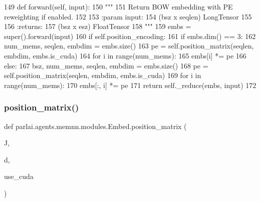 \begin{DoxyCode}
149     \textcolor{keyword}{def }forward(self, input):
150         \textcolor{stringliteral}{"""}
151 \textcolor{stringliteral}{        Return BOW embedding with PE reweighting if enabled.}
152 \textcolor{stringliteral}{}
153 \textcolor{stringliteral}{        :param input:}
154 \textcolor{stringliteral}{            (bsz x seqlen) LongTensor}
155 \textcolor{stringliteral}{}
156 \textcolor{stringliteral}{        :returns:}
157 \textcolor{stringliteral}{            (bsz x esz) FloatTensor}
158 \textcolor{stringliteral}{        """}
159         embs = super().forward(input)
160         \textcolor{keywordflow}{if} self.position\_encoding:
161             \textcolor{keywordflow}{if} embs.dim() == 3:
162                 num\_mems, seqlen, embdim = embs.size()
163                 pe = self.position\_matrix(seqlen, embdim, embs.is\_cuda)
164                 \textcolor{keywordflow}{for} i \textcolor{keywordflow}{in} range(num\_mems):
165                     embs[i] *= pe
166             \textcolor{keywordflow}{else}:
167                 bsz, num\_mems, seqlen, embdim = embs.size()
168                 pe = self.position\_matrix(seqlen, embdim, embs.is\_cuda)
169                 \textcolor{keywordflow}{for} i \textcolor{keywordflow}{in} range(num\_mems):
170                     embs[:, i] *= pe
171         \textcolor{keywordflow}{return} self.\_reduce(embs, input)
172 
\end{DoxyCode}
\mbox{\label{classparlai_1_1agents_1_1memnn_1_1modules_1_1Embed_aa6a44a42ac7d06f0f0598b7291d1dc58}} 
\subsubsection{\texorpdfstring{position\+\_\+matrix()}{position\_matrix()}}
{\footnotesize\ttfamily def parlai.\+agents.\+memnn.\+modules.\+Embed.\+position\+\_\+matrix (\begin{DoxyParamCaption}\item[{}]{J,  }\item[{}]{d,  }\item[{}]{use\+\_\+cuda }\end{DoxyParamCaption})}


